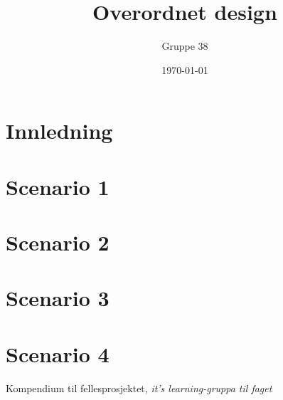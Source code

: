 \documentclass[titlepage]{article}
\author{Gruppe 38}
\title{Overordnet design}
\date{\today}
\begin{document}
\maketitle

\begin{abstract}

\end{abstract}

\tableofcontents


\newpage
\section{Innledning}


\newpage
\section{Scenario 1}


\newpage
\section{Scenario 2}


\newpage
\section{Scenario 3}


\newpage
\section{Scenario 4}



\newpage
\listoftables

\newpage
\listoffigures

\newpage
\begin{thebibliography}{9}

	Kompendium til fellesprosjektet,
	\emph{it's learning-gruppa til faget}
\end{thebibliography}
\end{document}
